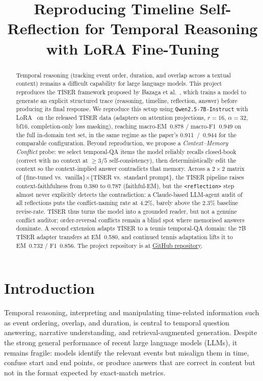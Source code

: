 \documentclass[conference]{IEEEtran}
\title{Reproducing Timeline Self-Reflection for Temporal Reasoning with LoRA Fine-Tuning}
\author{
\IEEEauthorblockN{
Gabriele Adorni s349308,
Berk Calisir s347896
Alessandro Casadei s349386, \\
Taha Atabay Cetin s349501,
Elias Noorzad s314515
}
\IEEEauthorblockA{
Politecnico di Torino\\
Deep Natural Language Processing\\
}
}
\begin{document}
\maketitle

\begin{abstract}
Temporal reasoning (tracking event order, duration, and overlap across a textual context) remains a difficult capability for large language models. This project reproduces the TISER framework proposed by Bazaga et al.~\cite{bazaga2025tiser}, which trains a model to generate an explicit structured trace (reasoning, timeline, reflection, answer) before producing its final response. We reproduce this setup using \texttt{Qwen2.5-7B-Instruct} with LoRA~\cite{hu2022lora} on the released TISER data (adapters on attention projections, $r{=}16$, $\alpha{=}32$, bf16, completion-only loss masking), reaching macro-EM~0.878 / macro-F1~0.949 on the full in-domain test set, in the same regime as the paper's 0.911~/~0.944 for the comparable configuration. Beyond reproduction, we propose a \emph{Context--Memory Conflict} probe: we select temporal-QA items the model reliably recalls closed-book (correct with no context at ${\geq}3/5$ self-consistency), then deterministically edit the context so the context-implied answer contradicts that memory. Across a $2{\times}2$ matrix of \{fine-tuned vs.\ vanilla\}${\times}$\{TISER vs.\ standard prompt\}, the TISER pipeline raises context-faithfulness from 0.380 to 0.787 (faithful-EM), but the \texttt{<reflection>} step almost never explicitly detects the contradiction: a Claude-based LLM-agent audit of all reflections puts the conflict-naming rate at 4.2\%, barely above the 2.3\% baseline revise-rate. TISER thus turns the model into a grounded reader, but not a genuine conflict auditor; order-reversal conflicts remain a blind spot where memorised answers dominate. A second extension adapts TISER to a tennis temporal-QA domain: the 7B TISER adapter transfers at EM~0.580, and continued tennis adaptation lifts it to EM~0.732 / F1~0.856.
The project repository is at \href{https://github.com/thestbobo/tiser_temporal_reasoning_extension}{GitHub repository}.
\end{abstract}

\section{Introduction}

Temporal reasoning, interpreting and manipulating time-related information such as event ordering, overlap, and duration, is central to temporal question answering, narrative understanding, and retrieval-augmented generation. Despite the strong general performance of recent large language models (LLMs), it remains fragile: models identify the relevant events but misalign them in time, confuse start and end points, or produce answers that are correct in content but not in the format expected by exact-match metrics.
\end{document}
